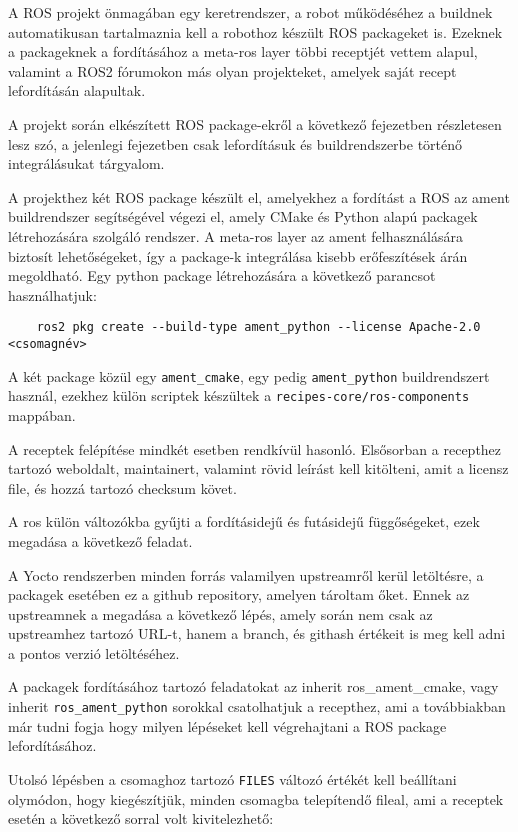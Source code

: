 A ROS projekt önmagában egy keretrendszer, a robot működéséhez a buildnek
automatikusan tartalmaznia kell a robothoz készült ROS packageket is. Ezeknek a
packageknek a fordításához a meta-ros layer többi receptjét vettem alapul,
valamint a ROS2 fórumokon más olyan projekteket, amelyek saját recept
lefordításán alapultak.

A projekt során elkészített ROS package-ekről a következő fejezetben részletesen
lesz szó, a jelenlegi fejezetben csak lefordításuk és buildrendszerbe történő
integrálásukat tárgyalom.

A projekthez két ROS package készült el, amelyekhez a fordítást a ROS az ament
buildrendszer segítségével végezi el, amely CMake és Python alapú packagek
létrehozására szolgáló rendszer. A meta-ros layer az ament felhasználására
biztosít lehetőségeket, így a package-k integrálása kisebb erőfeszítések árán
megoldható. Egy python package létrehozására a következő parancsot használhatjuk:


\begin{verbatim}
    ros2 pkg create --build-type ament_python --license Apache-2.0 <csomagnév> 
\end{verbatim}

A két package közül egy \verb|ament_cmake|, egy pedig \verb|ament_python|
buildrendszert használ, ezekhez külön scriptek készültek a
\verb|recipes-core/ros-components| mappában.

A receptek felépítése mindkét esetben rendkívül hasonló. Elsősorban a recepthez
tartozó weboldalt, maintainert, valamint rövid leírást kell kitölteni, amit a
licensz file, és hozzá tartozó checksum követ.

A ros külön változókba gyűjti a fordításidejű és futásidejű függőségeket, ezek
megadása a következő feladat. 

A Yocto rendszerben minden forrás valamilyen upstreamről kerül letöltésre, a
packagek esetében ez a github repository, amelyen tároltam őket. Ennek az
upstreamnek a megadása a következő lépés, amely során nem csak az upstreamhez
tartozó URL-t, hanem a branch, és githash értékeit is meg kell adni a pontos
verzió letöltéséhez. 

A packagek fordításához tartozó feladatokat az inherit ros\_ament\_cmake, vagy
inherit \verb|ros_ament_python| sorokkal csatolhatjuk a recepthez, ami a továbbiakban
már tudni fogja hogy milyen lépéseket kell végrehajtani a ROS package
lefordításához.

Utolsó lépésben a csomaghoz tartozó \verb|FILES| változó értékét kell beállítani
olymódon, hogy kiegészítjük, minden csomagba telepítendő fileal, ami a receptek
esetén a következő sorral volt kivitelezhető:


